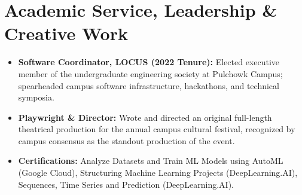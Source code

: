 \documentclass[10pt,letterpaper]{article}
\begin{document}
\section{Academic Service, Leadership \& Creative Work}
\begin{itemize}[leftmargin=*,itemsep=1pt,topsep=1pt]
  \item \textbf{Software Coordinator, LOCUS (2022 Tenure):} Elected executive member of the undergraduate engineering society at Pulchowk Campus; spearheaded campus software infrastructure, hackathons, and technical symposia.
  \item \textbf{Playwright \& Director:} Wrote and directed an original full-length theatrical production for the annual campus cultural festival, recognized by campus consensus as the standout production of the event.
  \item \textbf{Certifications:} Analyze Datasets and Train ML Models using AutoML (Google Cloud), Structuring Machine Learning Projects (DeepLearning.AI), Sequences, Time Series and Prediction (DeepLearning.AI).
\end{itemize}
\end{document}
